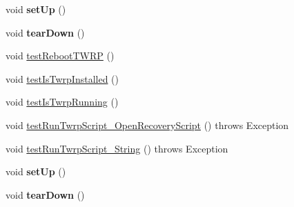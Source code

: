 \begin{DoxyCompactItemize}
\item 
\hypertarget{class_c_a_s_u_a_l_1_1communicationstools_1_1adb_1_1twrprecovery_1_1_twrp_communications_test_aa8fcbf6b2f728188250b422c77745a5a}{void {\bfseries set\-Up} ()}\label{class_c_a_s_u_a_l_1_1communicationstools_1_1adb_1_1twrprecovery_1_1_twrp_communications_test_aa8fcbf6b2f728188250b422c77745a5a}

\item 
\hypertarget{class_c_a_s_u_a_l_1_1communicationstools_1_1adb_1_1twrprecovery_1_1_twrp_communications_test_af79e645a1aae29ff488a43b6ef2edef3}{void {\bfseries tear\-Down} ()}\label{class_c_a_s_u_a_l_1_1communicationstools_1_1adb_1_1twrprecovery_1_1_twrp_communications_test_af79e645a1aae29ff488a43b6ef2edef3}

\item 
void \hyperlink{class_c_a_s_u_a_l_1_1communicationstools_1_1adb_1_1twrprecovery_1_1_twrp_communications_test_a5a4d7eee88151e0fc3793164f64bb4b5}{test\-Reboot\-T\-W\-R\-P} ()
\item 
void \hyperlink{class_c_a_s_u_a_l_1_1communicationstools_1_1adb_1_1twrprecovery_1_1_twrp_communications_test_a0073bbc92106964d6930e36e4f7a5e1c}{test\-Is\-Twrp\-Installed} ()
\item 
void \hyperlink{class_c_a_s_u_a_l_1_1communicationstools_1_1adb_1_1twrprecovery_1_1_twrp_communications_test_a9be7e808dbc296ed18f6c9b31b2f0e9f}{test\-Is\-Twrp\-Running} ()
\item 
void \hyperlink{class_c_a_s_u_a_l_1_1communicationstools_1_1adb_1_1twrprecovery_1_1_twrp_communications_test_a8df3cf9e455dd49c7f9115e75dfbce29}{test\-Run\-Twrp\-Script\-\_\-\-Open\-Recovery\-Script} ()  throws Exception 
\item 
void \hyperlink{class_c_a_s_u_a_l_1_1communicationstools_1_1adb_1_1twrprecovery_1_1_twrp_communications_test_a4367c1a2e9b517dde213baeb460ff00f}{test\-Run\-Twrp\-Script\-\_\-\-String} ()  throws Exception 
\item 
\hypertarget{class_c_a_s_u_a_l_1_1communicationstools_1_1adb_1_1twrprecovery_1_1_twrp_communications_test_aa8fcbf6b2f728188250b422c77745a5a}{void {\bfseries set\-Up} ()}\label{class_c_a_s_u_a_l_1_1communicationstools_1_1adb_1_1twrprecovery_1_1_twrp_communications_test_aa8fcbf6b2f728188250b422c77745a5a}

\item 
\hypertarget{class_c_a_s_u_a_l_1_1communicationstools_1_1adb_1_1twrprecovery_1_1_twrp_communications_test_af79e645a1aae29ff488a43b6ef2edef3}{void {\bfseries tear\-Down} ()}\label{class_c_a_s_u_a_l_1_1communicationstools_1_1adb_1_1twrprecovery_1_1_twrp_communications_test_af79e645a1aae29ff488a43b6ef2edef3}


\end{DoxyCompactItemize}
